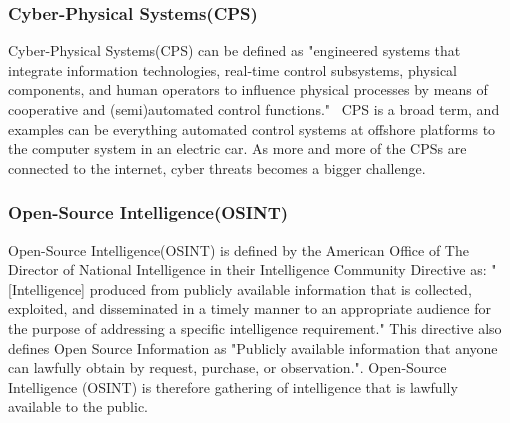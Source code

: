 \subsubsection{Cyber-Physical Systems(CPS)}\label{sec:cps}
Cyber-Physical Systems(CPS) can be defined as "engineered systems that integrate information technologies, real‐time control subsystems, physical components, and human operators to influence physical processes by means of cooperative and (semi)automated control functions."~\cite{guzman_wied_kozine_lundteigen_2019}
CPS is a broad term, and examples can be everything automated control systems at offshore platforms to the computer system in an electric car. As more and more of the CPSs are connected to the internet, cyber threats becomes a bigger challenge. 

\subsubsection{Open-Source Intelligence(OSINT)}\label{sec:osint}
Open-Source Intelligence(OSINT) is defined by the American Office of The Director of National Intelligence in their Intelligence Community Directive as: "[Intelligence] produced from publicly available information that is collected, exploited, and disseminated in a timely manner to an appropriate audience for the purpose of addressing a specific intelligence requirement."\cite{directive_301} This directive also defines Open Source Information as "Publicly available information that anyone can lawfully obtain by request, purchase, or observation.". Open-Source Intelligence (OSINT) is therefore gathering of intelligence that is lawfully available to the public. 

